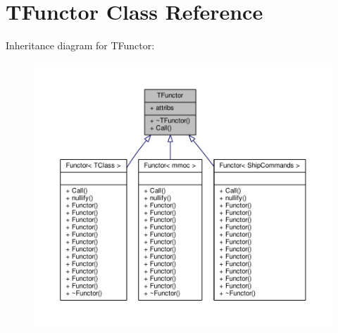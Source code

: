 \hypertarget{classTFunctor}{}\section{T\+Functor Class Reference}
\label{classTFunctor}


Inheritance diagram for T\+Functor\+:
\nopagebreak
\begin{figure}[H]
\begin{center}
\leavevmode
\includegraphics[width=350pt]{d6/d86/classTFunctor__inherit__graph}
\end{center}
\end{figure}


